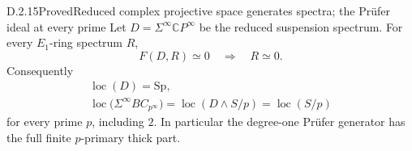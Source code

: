 \begin{claim}{D.2.15}{Proved}{Reduced complex projective space generates spectra; the Pr\"ufer ideal at every prime}
Let $D=\Sigma^\infty\mathbb CP^\infty$ be the reduced suspension
spectrum. For every $E_1$-ring spectrum $R$,
\[
 F(D,R)\simeq0\quad\Longrightarrow\quad R\simeq0.
 \tag{D.2.15a}
\]
Consequently
\[
 \begin{gathered}
 \operatorname{loc}(D)=\mathrm{Sp},\\
 \operatorname{loc}\bigl(\Sigma^\infty BC_{p^\infty}\bigr)
   =\operatorname{loc}(D\wedge S/p)=\operatorname{loc}(S/p)
 \end{gathered}
 \tag{D.2.15b}
\]
for every prime $p$, including $2$. In particular the degree-one
Pr\"ufer generator has the full finite $p$-primary thick part.
\end{claim}

